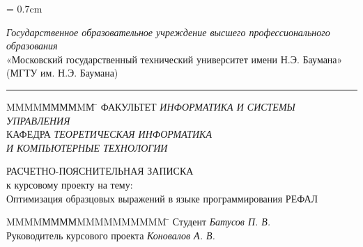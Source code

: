 \documentclass[12pt]{article}
\begin{document}

\setcounter{tocdepth}{4} %

\graphicspath{{chapter1/}}

\renewcommand{\contentsname}{\centering Содержание}
\parindent = 0.7cm

\begin{titlepage} %

\begin{center} %

\textit {Государственное образовательное учреждение высшего профессионального образования}\\

\huge«Московский государственный технический университет имени Н.Э. Баумана»\\
\Large {(МГТУ им. Н.Э. Баумана)}\\[0.2cm] 

\rule[+3mm]{7.5cm}{0.80mm}

\end{center} 

\begin{flushleft} %


\begin{tabbing}
MMMMММММMМ \= \kill
\large{ФАКУЛЬТЕТ} \> \large{\textit{ИНФОРМАТИКА И СИСТЕМЫ УПРАВЛЕНИЯ}} \\
\large{КАФЕДРА} \> \large{\textit{ТЕОРЕТИЧЕСКАЯ ИНФОРМАТИКА}} \\
 \> \large{\textit{И КОМПЬЮТЕРНЫЕ ТЕХНОЛОГИИ}}
\\
\end{tabbing}


\end{flushleft} 

\begin{center}


\Huge{РАСЧЕТНО-ПОЯСНИТЕЛЬНАЯ ЗАПИСКА}\\
к курсовому проекту на тему:\\
Оптимизация образцовых выражений в языке программирования РЕФАЛ\\[1.0cm]


\begin{tabbing}
MMMMММММMMMMMMMMMM \= \kill
\Large{Студент} \> \Large{\textit{Батусов П. В.}} \\
\Large{Руководитель курсового проекта} \> \Large{\textit{Коновалов А. В.}}\\[0.5cm]
\end{tabbing}


\end{center}

\thispagestyle{empty} %
\end{titlepage} %
\end{document}
